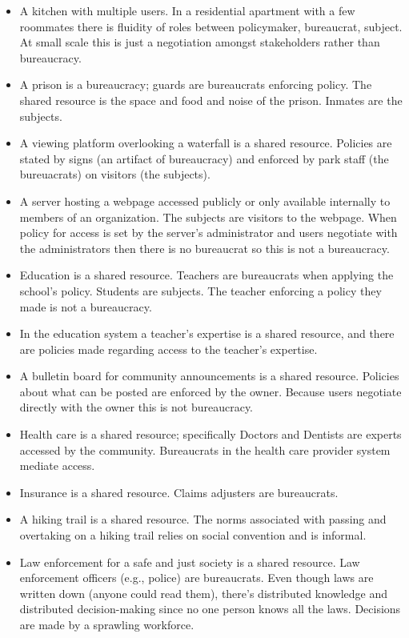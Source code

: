 {{\begin{itemize}
\item A kitchen with multiple users. In a residential apartment with a few roommates there is fluidity of roles between policymaker, bureaucrat, subject. At small scale this is just a negotiation amongst stakeholders rather than bureaucracy.
\item A prison is a bureaucracy; guards are bureaucrats enforcing policy. The shared resource is the space and food and noise of the prison. Inmates are the subjects.
\item A viewing platform overlooking a waterfall is a shared resource. Policies are stated by signs (an artifact of bureaucracy) and enforced by park staff (the bureuacrats) on visitors (the subjects).
\item A server hosting a webpage accessed publicly or only available internally to members of an organization. The subjects are visitors to the webpage. When policy for access is set by the server's administrator and users negotiate with the administrators then there is no bureaucrat so this is not a bureaucracy. 
\item Education is a shared resource. Teachers are bureaucrats when applying the school's policy. Students are subjects. The teacher enforcing a policy they made is not a bureaucracy.  
\item In the education system a teacher's expertise is a shared resource, and there are policies made regarding access to the teacher's expertise. 
\item A bulletin board for community announcements is a shared resource. Policies about what can be posted are enforced by the owner. Because users negotiate directly with the owner this is not bureaucracy.
\item Health care is a shared resource; specifically Doctors and Dentists are experts accessed by the community. Bureaucrats in the health care provider system mediate access.
\item Insurance is a shared resource. Claims adjusters are bureaucrats.
\item A hiking trail is a shared resource. The norms associated with passing and overtaking on a hiking trail
relies on social convention and is informal. %
\item Law enforcement for a safe and just society is a shared resource. Law enforcement officers (e.g., police) are bureaucrats. 
Even though laws are written down (anyone could read them), there's distributed knowledge and distributed decision-making since no one person knows all the laws. Decisions are made by a sprawling workforce.

\end{itemize}}}
